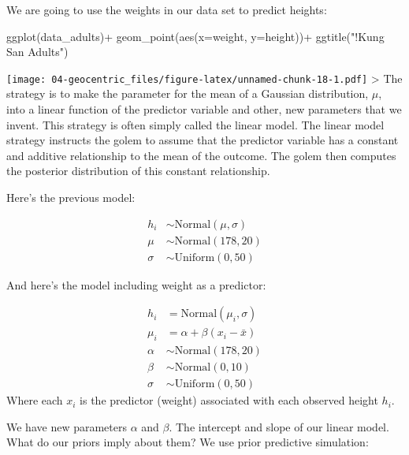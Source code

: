 \documentclass[
]{book}
\newenvironment{Shaded}{\begin{snugshade}}{\end{snugshade}}
\newcommand{\AttributeTok}[1]{\textcolor[rgb]{0.77,0.63,0.00}{#1}}
\newcommand{\FunctionTok}[1]{\textcolor[rgb]{0.00,0.00,0.00}{#1}}
\newcommand{\NormalTok}[1]{#1}
\newcommand{\SpecialCharTok}[1]{\textcolor[rgb]{0.00,0.00,0.00}{#1}}
\newcommand{\StringTok}[1]{\textcolor[rgb]{0.31,0.60,0.02}{#1}}
\begin{document}
We are going to use the weights in our data set to predict heights:

\begin{Shaded}
\begin{Highlighting}[]
\FunctionTok{ggplot}\NormalTok{(data\_adults)}\SpecialCharTok{+}
  \FunctionTok{geom\_point}\NormalTok{(}\FunctionTok{aes}\NormalTok{(}\AttributeTok{x=}\NormalTok{weight, }\AttributeTok{y=}\NormalTok{height))}\SpecialCharTok{+}
  \FunctionTok{ggtitle}\NormalTok{(}\StringTok{"!Kung San Adults"}\NormalTok{)}
\end{Highlighting}
\end{Shaded}

\texttt{[image: 04-geocentric\_files/figure-latex/unnamed-chunk-18-1.pdf]}
\textgreater{} The strategy is to make the parameter for the mean of a Gaussian distribution, \(\mu\), into a linear function of the predictor variable and other, new parameters that we invent. This strategy is often simply called the linear model. The linear model strategy instructs the golem to assume that the predictor variable has a constant and additive relationship to the mean of the outcome. The golem then computes the posterior distribution of this constant relationship.

Here's the previous model:

\[
\begin{aligned}
h_i &\sim \text{Normal}(\mu, \sigma)\\
\mu &\sim \text{Normal}(178, 20) \\
\sigma &\sim \text{Uniform}(0,50)
\end{aligned}
\]

And here's the model including weight as a predictor:

\[
\begin{aligned}
h_i &= \text{Normal}(\mu_i, \sigma)\\
\mu_i &= \alpha + \beta(x_i - \bar{x}) \\
\alpha &\sim \text{Normal}(178, 20) \\
\beta &\sim \text{Normal}(0, 10) \\
\sigma &\sim \text{Uniform}(0,50)
\end{aligned}
\]
Where each \(x_i\) is the predictor (weight) associated with each observed height \(h_i\).

We have new parameters \(\alpha\) and \(\beta\). The intercept and slope of our linear model. What do our priors imply about them? We use prior predictive simulation:
\end{document}
